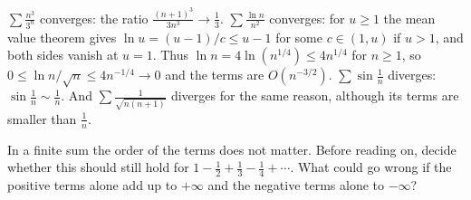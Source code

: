 \begin{examplex}
$\sum\frac{n^3}{3^n}$ converges: the ratio $\frac{(n+1)^3}{3n^3}\to\frac13$. $\sum\frac{\ln n}{n^2}$ converges: for $u\ge1$ the mean value theorem gives $\ln u=(u-1)/c\le u-1$ for some $c\in(1,u)$ if $u>1$, and both sides vanish at $u=1$. Thus $\ln n=4\ln(n^{1/4})\le4n^{1/4}$ for $n\ge1$, so $0\le\ln n/\sqrt n\le4n^{-1/4}\to0$ and the terms are $O(n^{-3/2})$. $\sum\sin\frac1n$ diverges: $\sin\frac1n\sim\frac1n$. And $\sum\frac1{\sqrt{n(n+1)}}$ diverges for the same reason, although its terms are smaller than $\frac1n$.
\end{examplex}

\begin{think}
In a finite sum the order of the terms does not matter. Before reading on, decide whether this should still hold for $1-\frac12+\frac13-\frac14+\cdots$. What could go wrong if the positive terms alone add up to $+\infty$ and the negative terms alone to $-\infty$?
\end{think}

